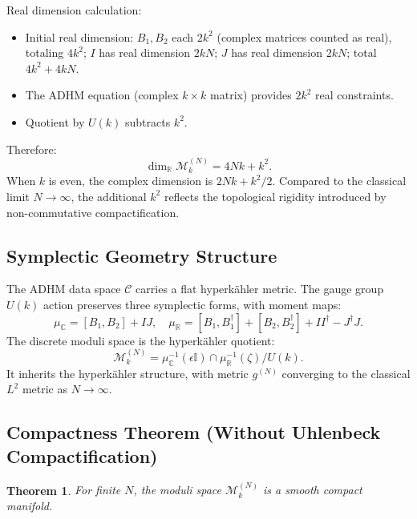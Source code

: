 \documentclass[12pt,a4paper]{amsart}
\theoremstyle{plain}
\newtheorem{theorem}{Theorem}[section]
\theoremstyle{definition}
\theoremstyle{remark}
\begin{document}
Real dimension calculation:
\begin{itemize}
\item Initial real dimension: $B_1,B_2$ each $2k^2$ (complex matrices counted as real), totaling $4k^2$; $I$ has real dimension $2kN$; $J$ has real dimension $2kN$; total $4k^2+4kN$.
\item The ADHM equation (complex $k\times k$ matrix) provides $2k^2$ real constraints.
\item Quotient by $U(k)$ subtracts $k^2$.
\end{itemize}
Therefore:
\begin{equation}\label{eq:dimension}
\boxed{\dim_{\mathbb{R}}\mathcal{M}_k^{(N)} = 4Nk + k^2.}
\end{equation}
When $k$ is even, the complex dimension is $2Nk + k^2/2$. Compared to the classical limit $N\to\infty$, the additional $k^2$ reflects the topological rigidity introduced by non-commutative compactification.

\subsection{Symplectic Geometry Structure}

The ADHM data space $\mathcal{C}$ carries a flat hyperk\"ahler metric. The gauge group $U(k)$ action preserves three symplectic forms, with moment maps:
\begin{equation}
\mu_{\mathbb{C}} = [B_1,B_2]+IJ,\quad \mu_{\mathbb{R}} = [B_1,B_1^\dagger]+[B_2,B_2^\dagger]+II^\dagger-J^\dagger J.
\end{equation}
The discrete moduli space is the hyperk\"ahler quotient:
\begin{equation}
\mathcal{M}_k^{(N)} = \mu_{\mathbb{C}}^{-1}(\epsilon\mathbb{I})\cap\mu_{\mathbb{R}}^{-1}(\zeta)/U(k).
\end{equation}
It inherits the hyperk\"ahler structure, with metric $g^{(N)}$ converging to the classical $L^2$ metric as $N\to\infty$.

\subsection{Compactness Theorem (Without Uhlenbeck Compactification)}

\begin{theorem}\label{thm:compact}
For finite $N$, the moduli space $\mathcal{M}_k^{(N)}$ is a smooth compact manifold.
\end{theorem}
\end{document}
